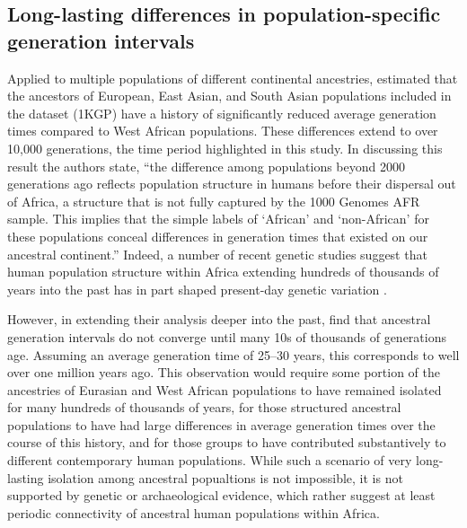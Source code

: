\documentclass[]{article}
\begin{document}
\subsection*{Long-lasting differences in population-specific generation intervals}

Applied to multiple populations of different continental ancestries,
\citet{wang2023human} estimated that the ancestors of European, East Asian, and
South Asian populations included in the \citet{1000genomes2015} dataset (1KGP)
have a history of significantly reduced average generation times compared to
West African populations. These differences extend to over 10,000 generations,
the time period highlighted in this study. In discussing this result the
authors state, ``the difference among populations beyond 2000 generations ago
reflects population structure in humans before their dispersal out of Africa, a
structure that is not fully captured by the 1000 Genomes AFR sample. This
implies that the simple labels of `African' and `non-African' for these
populations conceal differences in generation times that existed on our
ancestral continent.'' Indeed, a number of recent genetic studies suggest that
human population structure within Africa extending hundreds of thousands of
years into the past has in part shaped present-day genetic variation
\citep{hammer2011genetic,hsieh2016model,hey2018phylogeny,
ragsdale2019models,durvasula2020recovering,lorente2019whole}.

However, in extending their analysis deeper into the past,
\citet{wang2023human} find that ancestral generation intervals do not
converge until many 10s of thousands of generations age. Assuming an average
generation time of 25--30 years, this corresponds to well over one million
years ago. This observation would require some portion of the ancestries of
Eurasian and West African populations to have remained isolated for many
hundreds of thousands of years, for those structured ancestral populations to
have had large differences in average generation times over the course of this
history, and for those groups to have contributed substantively to different
contemporary human populations. While such a scenario of very long-lasting
isolation among ancestral popualtions is not impossible, it is not supported by
genetic \citep{ragsdale2022weakly,others} or archaeological
\citep{scerri2018did,others} evidence, which rather suggest at least periodic
connectivity of ancestral human populations within Africa.
\end{document}
